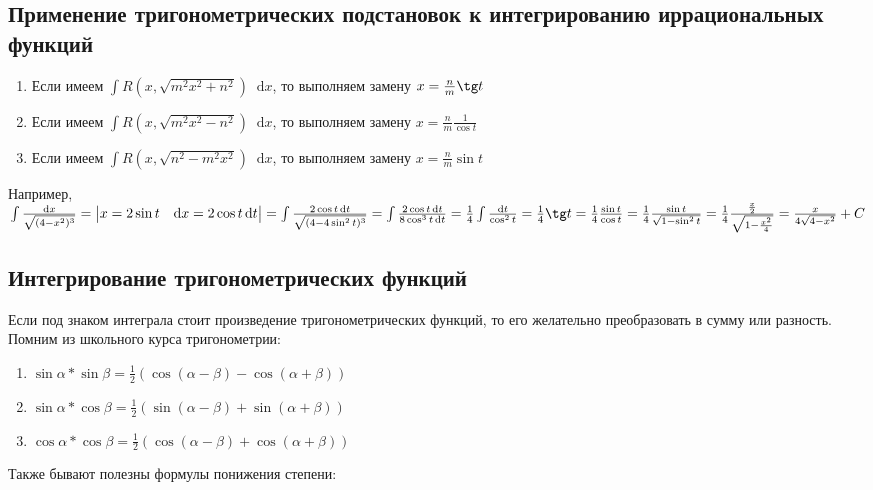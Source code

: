 \documentclass{article}
\newcommand*\diff{\mathop{}\!\mathrm{d}}
\begin{document}
\subsection{Применение тригонометрических подстановок к интегрированию иррациональных функций}

\begin{enumerate}
    \item Если имеем $\int R (x, \sqrt{m^2 x^2 + n^2}) \diff x$, то выполняем замену $x = \frac{n}{m} \tg t$
    \item Если имеем $\int R(x, \sqrt{m^2 x^2 - n^2}) \diff x$, то выполняем замену $x = \frac{n}{m} \frac{1}{\cos t}$
    \item Если имеем $\int R(x, \sqrt{n^2 - m^2 x^2}) \diff x$, то выполняем замену $x = \frac{n}{m} \sin t$
\end{enumerate}

Например, $\int \frac{\diff x}{\sqrt{(4 - x^2)^3}} = \begin{vmatrix}
    x = 2 \sin t & \diff x = 2 \cos t \diff t
\end{vmatrix} = \int \frac{2 \cos t \diff t}{\sqrt{(4 - 4 \sin^2 t)^3}} = \int \frac{2 \cos t \diff t}{8 \cos^3 t \diff t} = \frac{1}{4} \int \frac{\diff t}{\cos^2 t} = \frac{1}{4} \tg t = \frac{1}{4} \frac{\sin t}{\cos t} = \frac{1}{4} \frac{\sin t}{\sqrt{1 - \sin^2 t}} = \frac{1}{4} \frac{\frac{x}{2}}{\sqrt{1 - \frac{x^2}{4}}} = \frac{x}{4\sqrt{4 - x^2}} + C$

\subsection{Интегрирование тригонометрических функций}

Если под знаком интеграла стоит произведение тригонометрических функций, то его желательно преобразовать в сумму или разность. Помним из школьного курса тригонометрии:

\begin{enumerate}
    \item $\sin \alpha * \sin \beta = \frac{1}{2} (\cos (\alpha - \beta) - \cos (\alpha + \beta))$
    \item $\sin \alpha * \cos \beta = \frac{1}{2} (\sin (\alpha - \beta) + \sin (\alpha + \beta))$
    \item $\cos \alpha * \cos \beta = \frac{1}{2} (\cos (\alpha - \beta) + \cos (\alpha + \beta))$
\end{enumerate}

Также бывают полезны формулы понижения степени:
\end{document}
